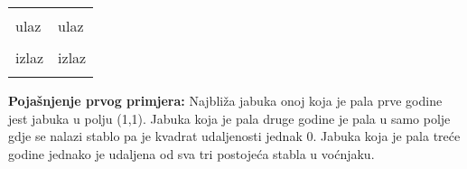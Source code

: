 \pagebreak


\begin{center}
\fontfamily{\ttdefault}
\fontsize{10pt}{1em}
\selectfont
\begin{tabu}to 0.99\textwidth{|X[1]|X[1]|}
\hline
& \\ 
\rowfont{\fontsize{10pt}{1em}\bfseries}
ulaz & ulaz \\
 &
 \\
\rowfont{\fontsize{10pt}{1em}\bfseries}
izlaz & izlaz \\
 &
 \\
\hline
\end{tabu}
\end{center}

{
\fontsize{10pt}{1em}
\selectfont
\textbf{Pojašnjenje prvog primjera:} Najbliža jabuka onoj koja je pala prve godine jest jabuka u polju (1,1). Jabuka koja je pala druge godine je pala u samo polje gdje se nalazi stablo pa je kvadrat udaljenosti jednak 0. Jabuka koja je pala treće godine jednako je udaljena od sva tri postojeća stabla u voćnjaku. \\
}